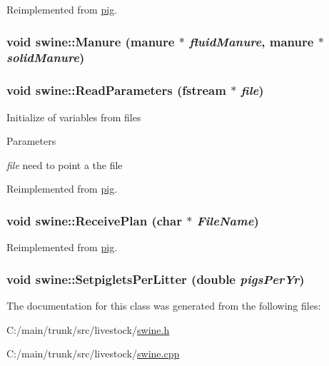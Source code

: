 Reimplemented from \hyperlink{classpig_a2c7c1a356646211e31753de053977520}{pig}.\hypertarget{classswine_ad92430630a6202c56dd7ca32e57784ac}{
\subsubsection[{Manure}]{\setlength{\rightskip}{0pt plus 5cm}void swine::Manure ({\bf manure} $\ast$ {\em fluidManure}, \/  {\bf manure} $\ast$ {\em solidManure})}}
\label{classswine_ad92430630a6202c56dd7ca32e57784ac}
\hypertarget{classswine_a57668c3c30994f0c3969dcef6d7280db}{
\subsubsection[{ReadParameters}]{\setlength{\rightskip}{0pt plus 5cm}void swine::ReadParameters (fstream $\ast$ {\em file})}}
\label{classswine_a57668c3c30994f0c3969dcef6d7280db}
Initialize of variables from files 
\begin{DoxyParams}{Parameters}
\item[{\em file}]need to point a the file \end{DoxyParams}


Reimplemented from \hyperlink{classpig_a43fbf15dc40e35fbfd5939c1748ff71b}{pig}.\hypertarget{classswine_af290612a28b7676522d5ae1f450c44ec}{
\subsubsection[{ReceivePlan}]{\setlength{\rightskip}{0pt plus 5cm}void swine::ReceivePlan (char $\ast$ {\em FileName})}}
\label{classswine_af290612a28b7676522d5ae1f450c44ec}


Reimplemented from \hyperlink{classpig_a093788c67f8ab28b6e9da95bca443b89}{pig}.\hypertarget{classswine_a3e452ad14938178c13053b5733f72b78}{
\subsubsection[{SetpigletsPerLitter}]{\setlength{\rightskip}{0pt plus 5cm}void swine::SetpigletsPerLitter (double {\em pigsPerYr})}}
\label{classswine_a3e452ad14938178c13053b5733f72b78}


The documentation for this class was generated from the following files:\begin{DoxyCompactItemize}
\item 
C:/main/trunk/src/livestock/\hyperlink{swine_8h}{swine.h}\item 
C:/main/trunk/src/livestock/\hyperlink{swine_8cpp}{swine.cpp}\end{DoxyCompactItemize}
